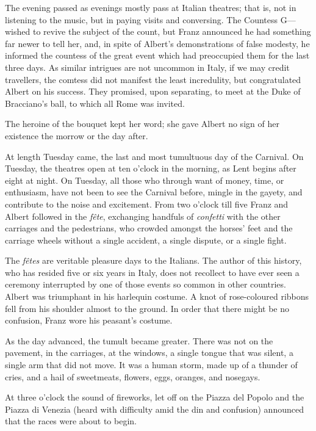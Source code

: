  The evening passed as evenings mostly pass at Italian theatres; that is, not in listening to the music, but in paying visits and conversing. The Countess G— wished to revive the subject of the count, but Franz announced he had something far newer to tell her, and, in spite of Albert's demonstrations of false modesty, he informed the countess of the great event which had preoccupied them for the last three days. As similar intrigues are not uncommon in Italy, if we may credit travellers, the comtess did not manifest the least incredulity, but congratulated Albert on his success. They promised, upon separating, to meet at the Duke of Bracciano's ball, to which all Rome was invited. 

 The heroine of the bouquet kept her word; she gave Albert no sign of her existence the morrow or the day after. 

 At length Tuesday came, the last and most tumultuous day of the Carnival. On Tuesday, the theatres open at ten o'clock in the morning, as Lent begins after eight at night. On Tuesday, all those who through want of money, time, or enthusiasm, have not been to see the Carnival before, mingle in the gayety, and contribute to the noise and excitement. From two o'clock till five Franz and Albert followed in the \textit{fête}, exchanging handfuls of \textit{confetti} with the other carriages and the pedestrians, who crowded amongst the horses' feet and the carriage wheels without a single accident, a single dispute, or a single fight. 

 The \textit{fêtes} are veritable pleasure days to the Italians. The author of this history, who has resided five or six years in Italy, does not recollect to have ever seen a ceremony interrupted by one of those events so common in other countries. Albert was triumphant in his harlequin costume. A knot of rose-coloured ribbons fell from his shoulder almost to the ground. In order that there might be no confusion, Franz wore his peasant's costume. 

 As the day advanced, the tumult became greater. There was not on the pavement, in the carriages, at the windows, a single tongue that was silent, a single arm that did not move. It was a human storm, made up of a thunder of cries, and a hail of sweetmeats, flowers, eggs, oranges, and nosegays. 

 At three o'clock the sound of fireworks, let off on the Piazza del Popolo and the Piazza di Venezia (heard with difficulty amid the din and confusion) announced that the races were about to begin. 

